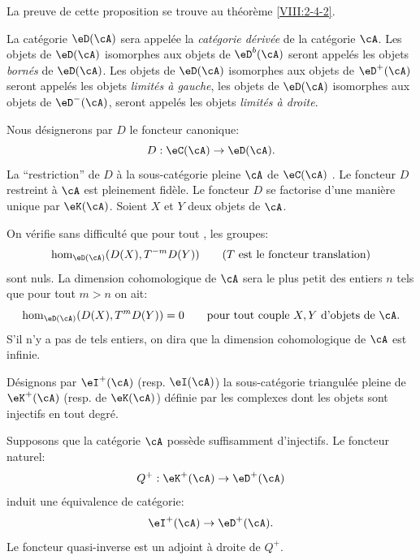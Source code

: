 La preuve de cette proposition se trouve au théorème \ref{VIII:2-4-2}. 





\begin{definition}\label{VIII:3-1-3}
La catégorie $\eD(\cA)$ sera appelée la \emph{catégorie dérivée} de la 
catégorie $\cA$. Les objets de $\eD(\cA)$ isomorphes aux objets de $\eD^b(\cA)$ 
seront appelés les objets \emph{bornés} de $\eD(\cA)$. Les objets de 
$\eD(\cA)$ isomorphes aux objets de $\eD^+(\cA)$ seront appelés les objets 
\emph{limités à gauche}, les objets de $\eD(\cA)$ isomorphes aux objets de 
$\eD^-(\cA)$, seront appelés les objets \emph{limités à droite}. 
\end{definition}

Nous désignerons par $D$ le foncteur canonique: 
\[
  D : \eC(\cA) \to \eD(\cA) \text{.}
\]
La ``restriction'' de $D$ à la sous-catégorie pleine $\cA$ de $\eC(\cA)$ 
. Le foncteur $D$ restreint à $\cA$ est pleinement 
fidèle. Le foncteur $D$ se factorise d'une manière unique par $\eK(\cA)$. 
Soient $X$ et $Y$ deux objets de $\cA$. 

On vérifie sans difficulté que pour tout , les groupes: 
\[
  \hom_{\eD(\cA)}(D(X),T^{-m} D(Y)) \qquad \text{($T$ est le foncteur translation)} 
\]
sont nuls. La dimension cohomologique de $\cA$ sera le plus petit des entiers 
$n$ tels que pour tout $m>n$ on ait: 
\[
  \hom_{\eD(\cA)}(D(X),T^m D(Y)) = 0 \qquad\text{pour tout couple $X,Y$ d'objets de $\cA$.} 
\]
S'il n'y a pas de tels entiers, on dira que la dimension cohomologique de $\cA$ 
est infinie. 

Désignons par $\eI^+(\cA)$ (resp. $\eI(\cA)$) la sous-catégorie triangulée 
pleine de $\eK^+(\cA)$ (resp. de $\eK(\cA)$) définie par les complexes dont 
les objets sont injectifs en tout degré. 





\begin{proposition}\label{VIII:3-1-4}
Supposons que la catégorie $\cA$ possède suffisamment d'injectifs. Le 
foncteur naturel: 
\[
  Q^+:\eK^+(\cA) \to \eD^+(\cA) 
\]
induit une équivalence de catégorie: 
\[
  \eI^+(\cA) \to \eD^+(\cA)  \text{.}
\]
Le foncteur quasi-inverse est un adjoint à droite de $Q^+$. 
\end{proposition}

